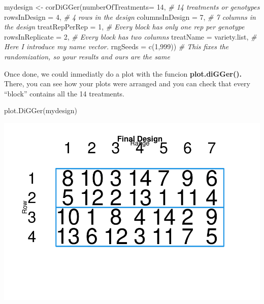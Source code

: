 \documentclass[
]{book}
\newenvironment{Shaded}{\begin{snugshade}}{\end{snugshade}}
\newcommand{\AttributeTok}[1]{\textcolor[rgb]{0.77,0.63,0.00}{#1}}
\newcommand{\CommentTok}[1]{\textcolor[rgb]{0.56,0.35,0.01}{\textit{#1}}}
\newcommand{\DecValTok}[1]{\textcolor[rgb]{0.00,0.00,0.81}{#1}}
\newcommand{\FunctionTok}[1]{\textcolor[rgb]{0.00,0.00,0.00}{#1}}
\newcommand{\NormalTok}[1]{#1}
\newcommand{\OtherTok}[1]{\textcolor[rgb]{0.56,0.35,0.01}{#1}}
\begin{document}
\begin{Shaded}
\begin{Highlighting}[]
\NormalTok{mydesign }\OtherTok{\textless{}{-}} \FunctionTok{corDiGGer}\NormalTok{(}\AttributeTok{numberOfTreatments=} \DecValTok{14}\NormalTok{,    }\CommentTok{\# 14 treatments or genotypes}
                  \AttributeTok{rowsInDesign =} \DecValTok{4}\NormalTok{,              }\CommentTok{\# 4 rows in the design}
                  \AttributeTok{columnsInDesign =} \DecValTok{7}\NormalTok{,           }\CommentTok{\# 7 columns in the design}
                  \AttributeTok{treatRepPerRep =} \DecValTok{1}\NormalTok{,            }\CommentTok{\# Every block has only one rep per genotype}
                  \AttributeTok{rowsInReplicate =} \DecValTok{2}\NormalTok{,           }\CommentTok{\# Every block has two columns}
                  \AttributeTok{treatName =}\NormalTok{ variety.list,      }\CommentTok{\# Here I introduce my name vector.}
                  \AttributeTok{rngSeeds =} \FunctionTok{c}\NormalTok{(}\DecValTok{1}\NormalTok{,}\DecValTok{999}\NormalTok{))           }\CommentTok{\# This fixes the randomization, so your results and ours are the same}
\end{Highlighting}
\end{Shaded}

Once done, we could inmediatly do a plot with the funcion \textbf{plot.diGGer().} There, you can see how your plots were arranged and you can check that every ``block'' contains all the 14 treatments.

\begin{Shaded}
\begin{Highlighting}[]
\FunctionTok{plot.DiGGer}\NormalTok{(mydesign)}
\end{Highlighting}
\end{Shaded}

\includegraphics{PPB-Toolkit-for-R-and-R-Studio_files/figure-latex/unnamed-chunk-72-1.pdf}
\end{document}
